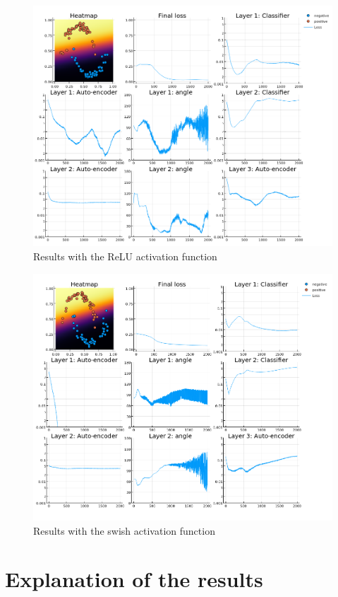 \begin{figure}[h]
	\centering
	\includegraphics[width=500pt]{images/temp-relu.png}
	\caption{Results with the ReLU activation function}\label{relu}
\end{figure}

\begin{figure}[h]
	\centering
	\includegraphics[width=500pt]{images/temp-swish.png}
	\caption{Results with the swish activation function}\label{swish}
\end{figure}

\section{Explanation of the results}

